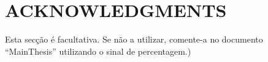 \chapter{ACKNOWLEDGMENTS}
Esta secção é facultativa. Se não a utilizar, comente-a no documento ``MainThesis'' utilizando o sinal de percentagem.)
